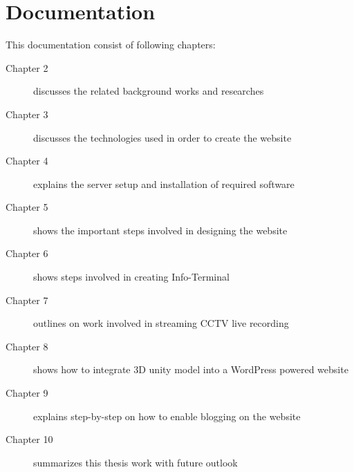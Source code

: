 \section{Documentation}
This documentation consist of following chapters:
\begin{description}
\item[Chapter 2] discusses the related background works and researches
\item[Chapter 3] discusses the technologies used in order to create the website
\item[Chapter 4] explains the server setup and installation of required software
\item[Chapter 5] shows the important steps involved in designing the website
\item[Chapter 6] shows steps involved in creating Info-Terminal
\item[Chapter 7] outlines on work involved in streaming CCTV live recording
\item[Chapter 8] shows how to integrate 3D unity model into a WordPress powered website
\item[Chapter 9] explains step-by-step on how to enable blogging on the website
\item[Chapter 10] summarizes this thesis work with future outlook
\end{description}